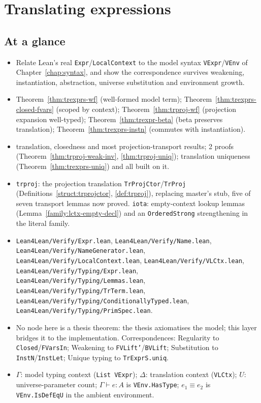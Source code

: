 \chapter{Translating expressions}
\label{chap:trexpr}

\section*{At a glance}
\begin{itemize}
\item {} Relate Lean's real \texttt{Expr}/\texttt{LocalContext} to the model syntax \texttt{VExpr}/\texttt{VEnv} of Chapter~\ref{chap:syntax}, and show the correspondence survives weakening, instantiation, abstraction, universe substitution and environment growth.
\item {} Theorem~\ref{thm:trexprs-wf} (well-formed model term); Theorem~\ref{thm:trexprs-closed-fvars} (scoped by context); Theorem~\ref{thm:trproj-wf} (projection expansion well-typed); Theorem~\ref{thm:trexpr-beta} (beta preserves translation); Theorem~\ref{thm:trexprs-instn} (commutes with instantiation).
\item {} \stProved{} translation, closedness and most projection-transport results; \stSorry{} 2 proofs (Theorem~\ref{thm:trproj-weak-inv}, \ref{thm:trproj-uniq}); \stTainted{} translation uniqueness (Theorem~\ref{thm:trexprs-uniq}) and all built on it.
\item {} \texttt{trproj}: the projection translation \texttt{TrProjCtor}/\texttt{TrProj} (Definitions~\ref{struct:trprojctor}, \ref{def:trproj}), replacing master's stub, five of seven transport lemmas now proved. \texttt{iota}: empty-context lookup lemmas (Lemma~\ref{family:lctx-empty-decl}) and an \texttt{OrderedStrong} strengthening in the literal family.
\item {} \texttt{Lean4Lean/Verify/Expr.lean}, \texttt{Lean4Lean/Verify/Name.lean}, \texttt{Lean4Lean/Verify/NameGenerator.lean}, \texttt{Lean4Lean/Verify/LocalContext.lean}, \texttt{Lean4Lean/Verify/VLCtx.lean}, \texttt{Lean4Lean/Verify/Typing/Expr.lean}, \texttt{Lean4Lean/Verify/Typing/Lemmas.lean}, \texttt{Lean4Lean/Verify/Typing/TrTerm.lean}, \texttt{Lean4Lean/Verify/Typing/ConditionallyTyped.lean}, \texttt{Lean4Lean/Verify/Typing/PrimSpec.lean}.
\item {} No node here is a thesis theorem: the thesis axiomatises the model; this layer bridges it to the implementation. Correspondences: Regularity to \texttt{Closed}/\texttt{FVarsIn}; Weakening to \texttt{FVLift'}/\texttt{BVLift}; Substitution to \texttt{InstN}/\texttt{InstLet}; Unique typing to \texttt{TrExprS.uniq}.
\item {} $\Gamma$: model typing context (\texttt{List VExpr}); $\Delta$: translation context (\texttt{VLCtx}); $U$: universe-parameter count; $\Gamma \vdash e : A$ is \texttt{VEnv.HasType}; $e_1 \equiv e_2$ is \texttt{VEnv.IsDefEqU} in the ambient environment.
\end{itemize}


